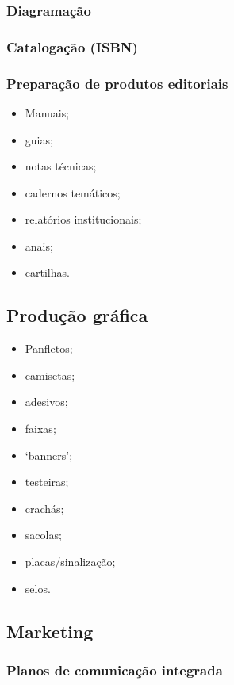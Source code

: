\subsubsection{Diagramação}

\subsubsection{Catalogação (ISBN)}

\subsubsection{Preparação de produtos editoriais}

\begin{itemize}
	\item
	Manuais;
	\item
	guias;
	\item
	notas técnicas;
	\item
	cadernos temáticos;
	\item
	relatórios institucionais;
	\item
	anais;
	\item
	cartilhas.
\end{itemize}

\subsection{Produção gráfica}

\begin{itemize}
	\item
	Panfletos;
	\item
	camisetas;
	\item
	adesivos;
	\item
	faixas;
	\item
	`banners';
	\item
	testeiras;
	\item
	crachás;
	\item
	sacolas;
	\item
	placas/sinalização;
	\item
	selos.
\end{itemize}

\subsection{Marketing}

\subsubsection{Planos de comunicação integrada}

